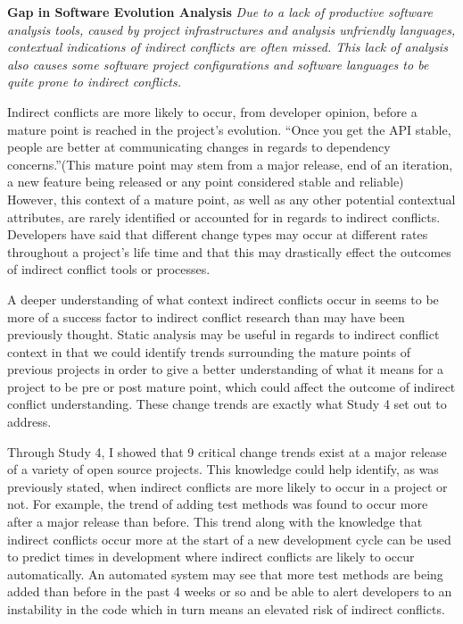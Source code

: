\textbf{Gap in Software Evolution Analysis} \textit{Due to a lack of productive software analysis tools, caused by project infrastructures
and analysis unfriendly languages, contextual indications of indirect conflicts are often missed. This lack of analysis also causes
some software project configurations and software languages to be quite prone to indirect conflicts.}

Indirect conflicts are more likely to occur,
from developer opinion, before a mature point is reached in the project's evolution. ``Once you get the API stable, people are 
better at communicating changes in regards to dependency concerns.''(This mature point may stem from a major release,
end of an iteration, a new feature being released or any point considered stable and reliable) However, this context of a 
mature point, as well as any other
potential contextual attributes, are rarely identified or accounted for in regards to indirect conflicts. Developers have said
that different change types may occur at different rates throughout a project's life time and that this
may drastically effect the outcomes of indirect conflict tools or processes.

A deeper understanding of what context indirect conflicts occur in seems to be more of a success factor to indirect conflict
research than may have been previously thought. Static analysis may be useful in regards to indirect conflict context in that we
could identify trends surrounding the mature points of previous projects in order to give a better understanding of what it
means for a project to be pre or post mature point, which could affect the outcome of indirect conflict understanding.
These change trends are exactly what Study 4 set out to address.

Through Study 4, I showed that 9 critical change trends exist at a major release of a variety of open source projects. This
knowledge could help identify, as was previously stated, when indirect conflicts are more likely to occur in a project or not.
For example, the trend of adding test methods was found to occur more after a major release than before. This trend along with
the knowledge that indirect conflicts occur more at the start of a new development cycle can be used to predict times in development
where indirect conflicts are likely to occur automatically. An automated system may see that more test methods are being added than
before in the past 4 weeks or so and be able to alert developers to an instability in the code which in turn means an elevated
risk of indirect conflicts.

